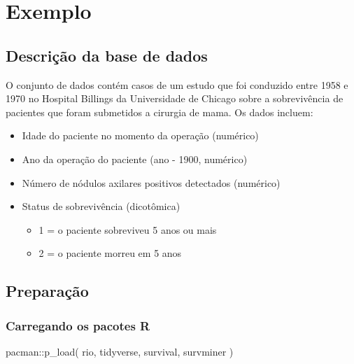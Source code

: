 \documentclass[
  letterpaper,
  DIV=11,
  numbers=noendperiod]{scrartcl}
\newenvironment{Shaded}{\begin{snugshade}}{\end{snugshade}}
\newcommand{\FunctionTok}[1]{\textcolor[rgb]{0.28,0.35,0.67}{#1}}
\newcommand{\NormalTok}[1]{\textcolor[rgb]{0.00,0.23,0.31}{#1}}
\newcommand{\SpecialCharTok}[1]{\textcolor[rgb]{0.37,0.37,0.37}{#1}}
\providecommand{\tightlist}{%
  \setlength{\itemsep}{0pt}\setlength{\parskip}{0pt}}\usepackage{longtable,booktabs,array}
\begin{document}
\section{Exemplo}\label{exemplo-2}

\subsection{Descrição da base de
dados}\label{descriuxe7uxe3o-da-base-de-dados-4}

O conjunto de dados contém casos de um estudo que foi conduzido entre
1958 e 1970 no Hospital Billings da Universidade de Chicago sobre a
sobrevivência de pacientes que foram submetidos a cirurgia de mama. Os
dados incluem:

\begin{itemize}
\tightlist
\item
  Idade do paciente no momento da operação (numérico)
\item
  Ano da operação do paciente (ano - 1900, numérico)
\item
  Número de nódulos axilares positivos detectados (numérico)
\item
  Status de sobrevivência (dicotômica)

  \begin{itemize}
  \tightlist
  \item
    1 = o paciente sobreviveu 5 anos ou mais
  \item
    2 = o paciente morreu em 5 anos
  \end{itemize}
\end{itemize}

\subsection{Preparação}\label{preparauxe7uxe3o-2}

\subsubsection{Carregando os pacotes R}\label{carregando-os-pacotes-r-2}

\begin{Shaded}
\begin{Highlighting}[]
\NormalTok{pacman}\SpecialCharTok{::}\FunctionTok{p\_load}\NormalTok{(}
\NormalTok{  rio,}
\NormalTok{  tidyverse,}
\NormalTok{  survival,}
\NormalTok{  survminer}
\NormalTok{) }
\end{Highlighting}
\end{Shaded}
\end{document}
